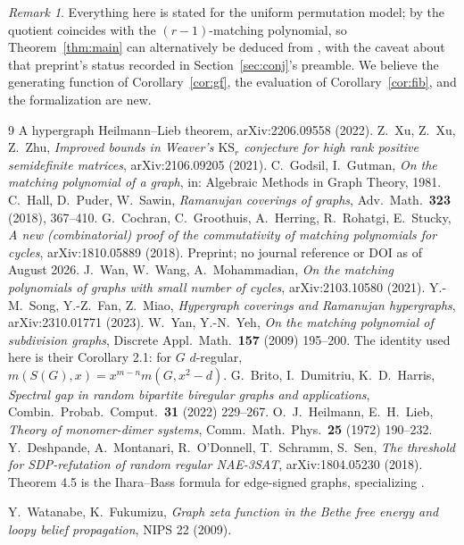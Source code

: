 \documentclass[11pt]{article}
\theoremstyle{remark}
\newtheorem{remark}[theorem]{Remark}
\begin{document}
\begin{remark}
Everything here is stated for the uniform permutation model; by
\cite{HPS} the quotient coincides with the $(r-1)$-matching polynomial,
so Theorem~\ref{thm:main} can alternatively be deduced from \cite{CGHRS}, with the caveat
about that preprint's status recorded in Section~\ref{sec:conj}'s preamble.
We believe the generating function of Corollary~\ref{cor:gf}, the
evaluation of Corollary~\ref{cor:fib}, and the formalization are new.
\end{remark}

\begin{thebibliography}{9}
 A hypergraph Heilmann--Lieb theorem, arXiv:2206.09558 (2022).
 Z.~Xu, Z.~Xu, Z.~Zhu, \emph{Improved bounds in Weaver's
$\mathrm{KS}_r$ conjecture for high rank positive semidefinite matrices},
arXiv:2106.09205 (2021).
 C.~Godsil, I.~Gutman, \emph{On the matching polynomial of a
graph}, in: Algebraic Methods in Graph Theory, 1981.
 C.~Hall, D.~Puder, W.~Sawin, \emph{Ramanujan coverings of
graphs}, Adv.\ Math.\ \textbf{323} (2018), 367--410.
 G.~Cochran, C.~Groothuis, A.~Herring, R.~Rohatgi,
E.~Stucky, \emph{A new (combinatorial) proof of the commutativity of
matching polynomials for cycles}, arXiv:1810.05889 (2018). Preprint; no journal
reference or DOI as of August 2026.
 J.~Wan, W.~Wang, A.~Mohammadian, \emph{On the matching
polynomials of graphs with small number of cycles}, arXiv:2103.10580 (2021).
 Y.-M.~Song, Y.-Z.~Fan, Z.~Miao, \emph{Hypergraph coverings and
Ramanujan hypergraphs}, arXiv:2310.01771 (2023).
 W.~Yan, Y.-N.~Yeh, \emph{On the matching polynomial of subdivision
graphs}, Discrete Appl.\ Math.\ \textbf{157} (2009) 195--200. The identity used
here is their Corollary 2.1: for $G$ $d$-regular, $m(S(G),x)=x^{m-n}m(G,x^2-d)$.
 G.~Brito, I.~Dumitriu, K.~D.~Harris, \emph{Spectral gap in random
bipartite biregular graphs and applications}, Combin.\ Probab.\ Comput.\
\textbf{31} (2022) 229--267.
 O.~J.~Heilmann, E.~H.~Lieb, \emph{Theory of monomer-dimer
systems}, Comm.\ Math.\ Phys.\ \textbf{25} (1972) 190--232.
 Y.~Deshpande, A.~Montanari, R.~O'Donnell, T.~Schramm, S.~Sen,
\emph{The threshold for SDP-refutation of random regular NAE-3SAT},
arXiv:1804.05230 (2018). Theorem 4.5 is the Ihara--Bass formula for edge-signed
graphs, specializing \cite{WF2}.

 Y.~Watanabe, K.~Fukumizu, \emph{Graph zeta function in the Bethe
free energy and loopy belief propagation}, NIPS 22 (2009).


\end{thebibliography}
\end{document}
